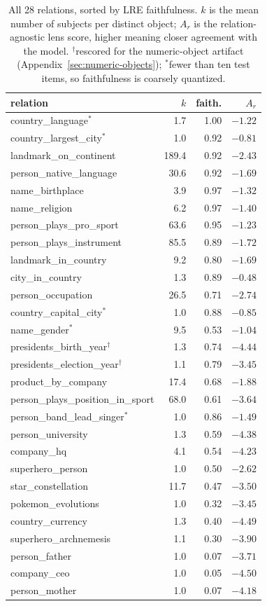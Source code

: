 \begin{table}[t]
\centering\small
\caption{All 28 relations, sorted by LRE faithfulness. $k$ is the mean number
of subjects per distinct object; $A_r$ is the relation-agnostic lens score, higher
meaning closer agreement with the model. $^{\dagger}$rescored for the
numeric-object artifact (Appendix~\ref{sec:numeric-objects}); $^{*}$fewer than ten test items,
so faithfulness is coarsely quantized.}
\label{tab:relations}
\begin{tabular}{@{}lrrr@{}}
\toprule
relation & $k$ & faith. & $A_r$ \\
\midrule
country\_language$^{*}$ & 1.7 & 1.00 & $-1.22$ \\
country\_largest\_city$^{*}$ & 1.0 & 0.92 & $-0.81$ \\
landmark\_on\_continent & 189.4 & 0.92 & $-2.43$ \\
person\_native\_language & 30.6 & 0.92 & $-1.69$ \\
name\_birthplace & 3.9 & 0.97 & $-1.32$ \\
name\_religion & 6.2 & 0.97 & $-1.40$ \\
person\_plays\_pro\_sport & 63.6 & 0.95 & $-1.23$ \\
person\_plays\_instrument & 85.5 & 0.89 & $-1.72$ \\
landmark\_in\_country & 9.2 & 0.80 & $-1.69$ \\
city\_in\_country & 1.3 & 0.89 & $-0.48$ \\
person\_occupation & 26.5 & 0.71 & $-2.74$ \\
country\_capital\_city$^{*}$ & 1.0 & 0.88 & $-0.85$ \\
name\_gender$^{*}$ & 9.5 & 0.53 & $-1.04$ \\
presidents\_birth\_year$^{\dagger}$ & 1.3 & 0.74 & $-4.44$ \\
presidents\_election\_year$^{\dagger}$ & 1.1 & 0.79 & $-3.45$ \\
product\_by\_company & 17.4 & 0.68 & $-1.88$ \\
person\_plays\_position\_in\_sport & 68.0 & 0.61 & $-3.64$ \\
person\_band\_lead\_singer$^{*}$ & 1.0 & 0.86 & $-1.49$ \\
person\_university & 1.3 & 0.59 & $-4.38$ \\
company\_hq & 4.1 & 0.54 & $-4.23$ \\
superhero\_person & 1.0 & 0.50 & $-2.62$ \\
star\_constellation & 11.7 & 0.47 & $-3.50$ \\
pokemon\_evolutions & 1.0 & 0.32 & $-3.45$ \\
country\_currency & 1.3 & 0.40 & $-4.49$ \\
superhero\_archnemesis & 1.1 & 0.30 & $-3.90$ \\
person\_father & 1.0 & 0.07 & $-3.71$ \\
company\_ceo & 1.0 & 0.05 & $-4.50$ \\
person\_mother & 1.0 & 0.07 & $-4.18$ \\
\bottomrule
\end{tabular}
\end{table}
